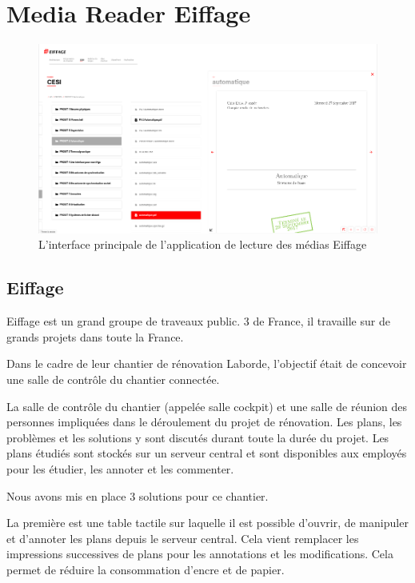 \section{Media Reader Eiffage}

\begin{figure}[h]
    \centering
    \includegraphics[scale=0.5]{img/media-reader.png}
    \caption{L'interface principale de l'application de lecture des médias Eiffage}
\end{figure}

\subsection{Eiffage}

Eiffage est un grand groupe de traveaux public.
3 de France, il travaille sur de grands projets dans toute la France.

Dans le cadre de leur chantier de rénovation Laborde, l'objectif était de concevoir une salle de contrôle du chantier connectée.

La salle de contrôle du chantier (appelée salle cockpit) et une salle de réunion des personnes impliquées dans le déroulement du projet de rénovation.
Les plans, les problèmes et les solutions y sont discutés durant toute la durée du projet.
Les plans étudiés sont stockés sur un serveur central et sont disponibles aux employés pour les étudier, les annoter et les commenter.

\medskip

Nous avons mis en place 3 solutions pour ce chantier.

La première est une table tactile sur laquelle il est possible d'ouvrir, de manipuler et d'annoter les plans depuis le serveur central.
Cela vient remplacer les impressions successives de plans pour les annotations et les modifications.
Cela permet de réduire la consommation d'encre et de papier.

